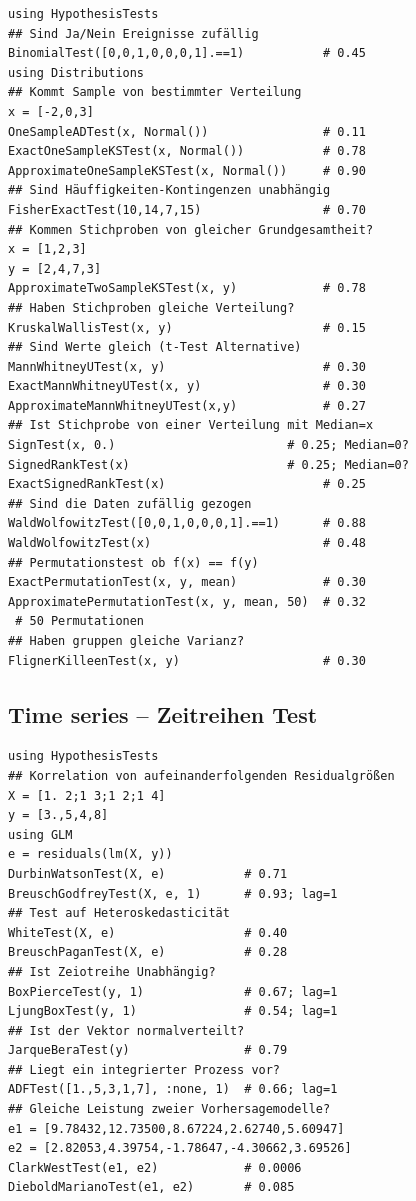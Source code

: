 \documentclass[10pt,twocolumn]{scrartcl}
\begin{document}
\begin{lstlisting}
using HypothesisTests
## Sind Ja/Nein Ereignisse zufällig
BinomialTest([0,0,1,0,0,0,1].==1)           # 0.45
using Distributions
## Kommt Sample von bestimmter Verteilung
x = [-2,0,3]
OneSampleADTest(x, Normal())                # 0.11
ExactOneSampleKSTest(x, Normal())           # 0.78
ApproximateOneSampleKSTest(x, Normal())     # 0.90
## Sind Häuffigkeiten-Kontingenzen unabhängig
FisherExactTest(10,14,7,15)                 # 0.70
## Kommen Stichproben von gleicher Grundgesamtheit?
x = [1,2,3]
y = [2,4,7,3]
ApproximateTwoSampleKSTest(x, y)            # 0.78
## Haben Stichproben gleiche Verteilung?
KruskalWallisTest(x, y)                     # 0.15
## Sind Werte gleich (t-Test Alternative)
MannWhitneyUTest(x, y)                      # 0.30
ExactMannWhitneyUTest(x, y)                 # 0.30
ApproximateMannWhitneyUTest(x,y)            # 0.27
## Ist Stichprobe von einer Verteilung mit Median=x
SignTest(x, 0.)                        # 0.25; Median=0?
SignedRankTest(x)                      # 0.25; Median=0?
ExactSignedRankTest(x)                      # 0.25
## Sind die Daten zufällig gezogen
WaldWolfowitzTest([0,0,1,0,0,0,1].==1)      # 0.88
WaldWolfowitzTest(x)                        # 0.48
## Permutationstest ob f(x) == f(y)
ExactPermutationTest(x, y, mean)            # 0.30
ApproximatePermutationTest(x, y, mean, 50)  # 0.32
 # 50 Permutationen
## Haben gruppen gleiche Varianz?
FlignerKilleenTest(x, y)                    # 0.30
\end{lstlisting}

\subsection{Time series -- Zeitreihen Test}

\begin{lstlisting}
using HypothesisTests
## Korrelation von aufeinanderfolgenden Residualgrößen
X = [1. 2;1 3;1 2;1 4]
y = [3.,5,4,8]
using GLM
e = residuals(lm(X, y))
DurbinWatsonTest(X, e)           # 0.71
BreuschGodfreyTest(X, e, 1)      # 0.93; lag=1
## Test auf Heteroskedasticität
WhiteTest(X, e)                  # 0.40
BreuschPaganTest(X, e)           # 0.28
## Ist Zeiotreihe Unabhängig?
BoxPierceTest(y, 1)              # 0.67; lag=1
LjungBoxTest(y, 1)               # 0.54; lag=1
## Ist der Vektor normalverteilt?
JarqueBeraTest(y)                # 0.79
## Liegt ein integrierter Prozess vor?
ADFTest([1.,5,3,1,7], :none, 1)  # 0.66; lag=1
## Gleiche Leistung zweier Vorhersagemodelle?
e1 = [9.78432,12.73500,8.67224,2.62740,5.60947]
e2 = [2.82053,4.39754,-1.78647,-4.30662,3.69526]
ClarkWestTest(e1, e2)            # 0.0006
DieboldMarianoTest(e1, e2)       # 0.085
\end{lstlisting}
\end{document}
